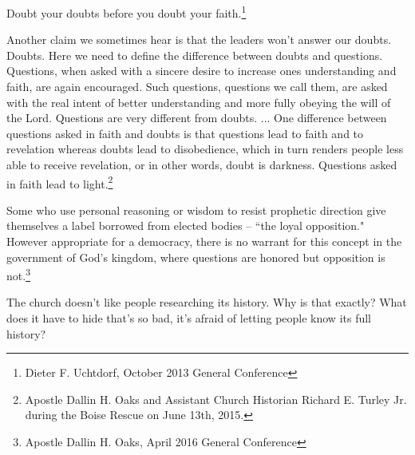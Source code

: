 \begin{displayquote}
Doubt your doubts before you doubt your faith.\footnote{Dieter F. Uchtdorf, 
October 2013 General Conference}
\end{displayquote}

\begin{displayquote}
Another claim we sometimes hear is that the leaders won't answer our doubts. Doubts.
Here we need to define the difference between doubts and questions. Questions, when
asked with a sincere desire to increase ones understanding and faith, are again
encouraged. Such questions, questions we call them, are asked with the real intent of
better understanding and more fully obeying the will of the Lord. Questions are very
different from doubts. ... One difference between questions asked in faith and doubts
is that questions lead to faith and to revelation whereas doubts lead to
disobedience, which in turn renders people less able to receive revelation, or in
other words, doubt is darkness. Questions asked in faith lead to light.\footnote{
Apostle Dallin H. Oaks and Assistant Church Historian Richard E. Turley Jr. 
during the Boise Rescue on June 13th, 2015.
}
\end{displayquote}

\begin{displayquote}
Some who use personal reasoning or wisdom to resist prophetic direction give
themselves a label borrowed from elected bodies -- ``the loyal opposition." However
appropriate for a democracy, there is no warrant for this concept in the government
of God's kingdom, where questions are honored but opposition is not.\footnote{
Apostle Dallin H. Oaks, April 2016 General Conference
}
\end{displayquote}

The church doesn't like people researching its history. Why is that exactly? What
does it have to hide that's so bad, it's afraid of letting people know its full
history?